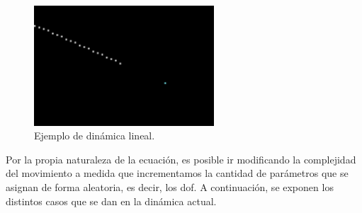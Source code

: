 \begin{figure}[H]
		\begin{center}
			\includegraphics[width=0.6\textwidth]{ figures/samples/linear2_sample.png}
			\caption{Ejemplo de dinámica lineal.}
			\label{fig.lineal}
		\end{center}
\end{figure}
\vspace{-10pt}
Por la propia naturaleza de la ecuación, es posible ir modificando la complejidad del movimiento a medida que incrementamos la cantidad de parámetros que se asignan de forma aleatoria, es decir, los \acrshort{dof}. A continuación, se exponen los distintos casos que se dan en la dinámica actual.

